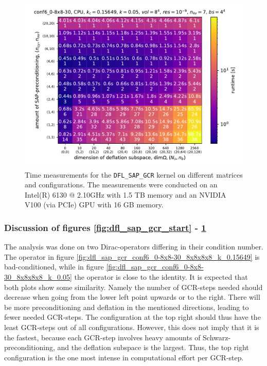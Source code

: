 \documentclass{article}
\theoremstyle{plain} %
\theoremstyle{convention} %
\theoremstyle{remark} %
\def\code#1{\texttt{#1}}
\numberwithin{equation}{section}
\begin{document}
\begin{figure}[h]
    \centering
    \includegraphics[width=1.0\textwidth]{plots/dfl_sap_gcr_conf6_0-8x8-30_8x8x8x8_k_0.05}
    \caption{Time measurements for the \code{DFL\_SAP\_GCR} kernel on different matrices and configurations. The measurements were conducted on an Intel(R) 6130 @ 2.10GHz with 1.5 TB memory and an NVIDIA V100 (via PCIe) GPU with 16 GB memory.}
    \label{fig:dfl_sap_gcr1}
    \label{fig:dfl_sap_gcr_conf6_0-8x8-30_8x8x8x8_k_0.05}
    \label{fig:dfl_sap_gcr_end}
\end{figure}

\subsubsection{Discussion of figures \ref{fig:dfl_sap_gcr_start} - \ref{fig:dfl_sap_gcr_end}}

The analysis was done on two Dirac-operators differing in their condition number. The operator in figure \ref{fig:dfl_sap_gcr_conf6_0-8x8-30_8x8x8x8_k_0.15649} is bad-conditioned, while in figure \ref{fig:dfl_sap_gcr_conf6_0-8x8-30_8x8x8x8_k_0.05} the operator is close to the identity. It is expected that both plots show some similarity. Namely the number of GCR-steps needed should decrease when going from the lower left point upwards or to the right. There will be more preconditioning and deflation in the mentioned directions, leading to fewer needed GCR-steps. The configuration at the top right should thus have the least GCR-steps out of all configurations. However, this does not imply that it is the fastest, because each GCR-step involves heavy amounts of Schwarz-preconditioning, and the deflation subspace is the largest. Thus, the top right configuration is the one most intense in computational effort per GCR-step.
\end{document}
